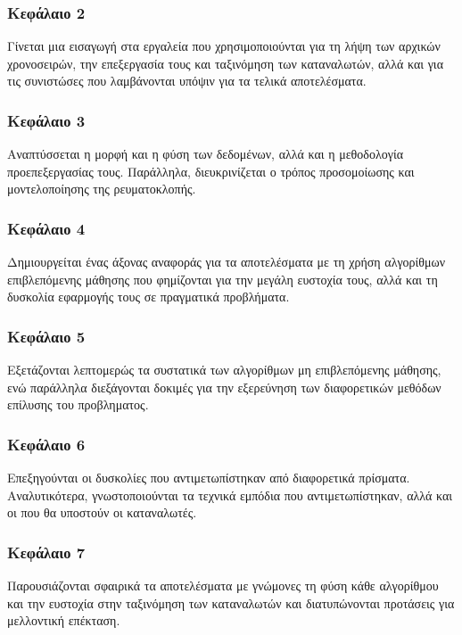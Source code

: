 \subsubsection{Κεφάλαιο 2}
Γίνεται μια εισαγωγή στα εργαλεία που χρησιμοποιούνται για τη λήψη των αρχικών χρονοσειρών, την επεξεργασία τους και ταξινόμηση των καταναλωτών, αλλά και για τις συνιστώσες που λαμβάνονται υπόψιν για τα τελικά αποτελέσματα.
\subsubsection{Κεφάλαιο 3}
Αναπτύσσεται η μορφή και η φύση των δεδομένων, αλλά και η μεθοδολογία προεπεξεργασίας τους. Παράλληλα, διευκρινίζεται ο τρόπος προσομοίωσης και μοντελοποίησης της ρευματοκλοπής.
\subsubsection{Κεφάλαιο 4}
Δημιουργείται ένας άξονας αναφοράς για τα αποτελέσματα με τη χρήση αλγορίθμων επιβλεπόμενης μάθησης που φημίζονται για την μεγάλη ευστοχία τους, αλλά και τη δυσκολία εφαρμογής τους σε πραγματικά προβλήματα.
\subsubsection{Κεφάλαιο 5}
Εξετάζονται λεπτομερώς τα συστατικά των αλγορίθμων μη επιβλεπόμενης μάθησης, ενώ παράλληλα διεξάγονται δοκιμές για την εξερεύνηση των διαφορετικών μεθόδων επίλυσης του προβληματος.
\subsubsection{Κεφάλαιο 6}
Επεξηγούνται οι δυσκολίες που αντιμετωπίστηκαν από διαφορετικά πρίσματα. Αναλυτικότερα, γνωστοποιούνται τα τεχνικά εμπόδια που αντιμετωπίστηκαν, αλλά και οι που θα υποστούν οι καταναλωτές.
\subsubsection{Κεφάλαιο 7}
Παρουσιάζονται σφαιρικά τα αποτελέσματα με γνώμονες τη φύση κάθε αλγορίθμου και την ευστοχία στην ταξινόμηση των καταναλωτών και διατυπώνονται προτάσεις για μελλοντική επέκταση.